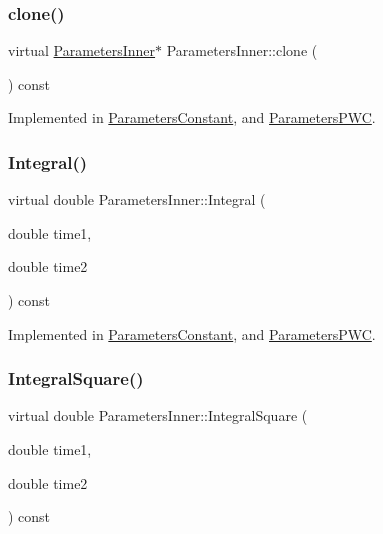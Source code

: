 \subsubsection{\texorpdfstring{clone()}{clone()}}
{\footnotesize\ttfamily virtual \hyperlink{classParametersInner}{Parameters\+Inner}$\ast$ Parameters\+Inner\+::clone (\begin{DoxyParamCaption}{ }\end{DoxyParamCaption}) const\hspace{0.3cm}{\ttfamily [pure virtual]}}



Implemented in \hyperlink{classParametersConstant_a8498b584b18a292e990c8eab5510763a}{Parameters\+Constant}, and \hyperlink{classParametersPWC_a14724b2321f515df6aef06b9badaf064}{Parameters\+P\+WC}.

\hypertarget{classParametersInner_ade3035097353fd2f38d3a20bf737d46a}{}\label{classParametersInner_ade3035097353fd2f38d3a20bf737d46a} 
\subsubsection{\texorpdfstring{Integral()}{Integral()}}
{\footnotesize\ttfamily virtual double Parameters\+Inner\+::\+Integral (\begin{DoxyParamCaption}\item[{double}]{time1,  }\item[{double}]{time2 }\end{DoxyParamCaption}) const\hspace{0.3cm}{\ttfamily [pure virtual]}}



Implemented in \hyperlink{classParametersConstant_afeb3f63d392314a243a0156599ee3a42}{Parameters\+Constant}, and \hyperlink{classParametersPWC_a42002b8d813dfaefe3a41f4a520ac6a6}{Parameters\+P\+WC}.

\hypertarget{classParametersInner_a12e3be9c5daf0d6dc74a460905f1b46e}{}\label{classParametersInner_a12e3be9c5daf0d6dc74a460905f1b46e} 
\subsubsection{\texorpdfstring{Integral\+Square()}{IntegralSquare()}}
{\footnotesize\ttfamily virtual double Parameters\+Inner\+::\+Integral\+Square (\begin{DoxyParamCaption}\item[{double}]{time1,  }\item[{double}]{time2 }\end{DoxyParamCaption}) const\hspace{0.3cm}{\ttfamily [pure virtual]}}



